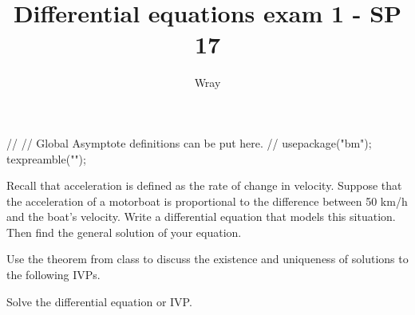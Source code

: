 \documentclass[12pt]{exam}
\title{Differential equations exam 1 - SP 17}
\author{Wray}
\begin{document}
\begin{asydef}
//
// Global Asymptote definitions can be put here.
//
usepackage("bm");
texpreamble("\def\V#1{\bm{#1}}");
\end{asydef}

\bigskip
\bigskip

\begin{questions}

\question[10]
Recall that acceleration is defined as the rate of change in velocity.  Suppose that the acceleration of a motorboat is proportional to the difference between 50 km/h and the boat's velocity.  Write a differential equation that models this situation.  Then find the general solution of your equation.


\question[10]
Use the theorem from class to discuss the existence and uniqueness of solutions to the following IVPs.


\clearpage

\question
Solve the differential equation or IVP.
\end{questions}
\end{document}
